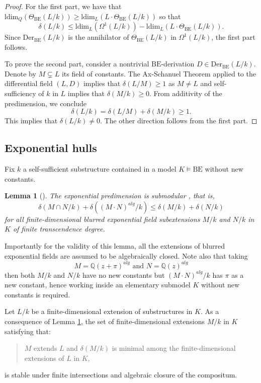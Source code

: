 \documentclass[12pt]{amsart}
\newcommand{\BE}{\mathrm{BE}}
\theoremstyle{definition}
\theoremstyle{plain}
\newtheorem{lem}[defn]{Lemma}
\theoremstyle{exampstyle}\newtheorem{thmx}{Theorem}
\theoremstyle{exampstyle}\newtheorem{thmxbis}{Theorem}
\begin{document}
\begin{proof} 
For the first part, we have that
$\mathrm{ldim}_Q(\Theta_{\BE}(L/k)) \geq \mathrm{ldim}_L(L\cdot\Theta_{\BE}(L/k))$
so that 
$$\delta(L/k) \leq \mathrm{ldim}_L( \Omega^1(L/k)) -  \mathrm{ldim}_L(L\cdot\Theta_{\BE}(L/k)).$$
Since $\mathrm{Der}_{\BE}(L/k)$ is the annihilator of $\Theta_{\BE}(L/k)$ in $\Omega^1(L/k)$, the first part follows. 

To prove the second part, consider a nontrivial $\BE$-derivation $D \in \mathrm{Der}_{\BE}(L/k)$. Denote by $M \subsetneq L$ its field of constants. The Ax-Schanuel Theorem applied to the differential field $(L,D)$ implies that $\delta(L/M) \geq 1$ as $M \neq L$ and self-sufficiency of $k$ in $L$ implies that $\delta(M/k) \geq 0$. From additivity of the predimension, we conclude 
$$ \delta(L/k) = \delta(L/M) + \delta(M/k) \geq 1.$$
This implies that $\delta(L/k) \neq 0$. The other direction follows from the first part.
\end{proof} 

\subsection{Exponential hulls} Fix $k$ a self-sufficient substructure contained in a model $K \models \BE$ without new constants.

\begin{lem}[{\citep[Lemma 3.9]{Kirby-semiab}}] \label{lemma-submodularity} The exponential predimension is {\em submodular },  that is,
$$\delta(M \cap N /k) + \delta((M \cdot N)^{alg}/k) \leq \delta(M/k) + \delta(N/k)$$
for all finite-dimensional blurred exponential field subextensions $M/k$ and $N/k$ in $K$ of finite transcendence degree.
\end{lem}
Importantly for the validity of this lemma, all the extensions of blurred exponential fields are assumed to be algebraically closed. Note also that taking 
$$ M = \mathbb{Q}(z + \pi)^{alg} \text{ and } N = \mathbb{Q}(z)^{alg}$$
then both $M/k$ and $N/k$ have no new constants but $(M \cdot N)^{alg}/k$ has $\pi$ as a new constant, hence working inside an elementary submodel $K$ without new constants is required. 


Let $L/k$ be a  finite-dimensional extension of substructures in $K$. As a consequence of Lemma \ref{lemma-submodularity}, the set of finite-dimensional extensions $M/k$ in $K$ satisfying that:

\begin{quote}
$M$ extends $L$ and $\delta(M/k)$ is minimal among the finite-dimensional extensions of $L$ in $K$,
\end{quote}
is stable under finite intersections and algebraic closure of the compositum. 
 
\end{document}
